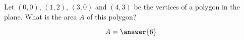 \documentclass{ximera}
\author{Gregory Hartman \and Matthew Carr}
\begin{document}
\begin{exercise}

Let $(0,0)$, $(1,2)$, $(3,0)$  and $(4,3)$ be the vertices of a polygon in the plane. What is the area $A$ of this polygon?
\begin{prompt}
\[
A=\answer{6}
\]
\end{prompt}


\end{exercise}
\end{document}
